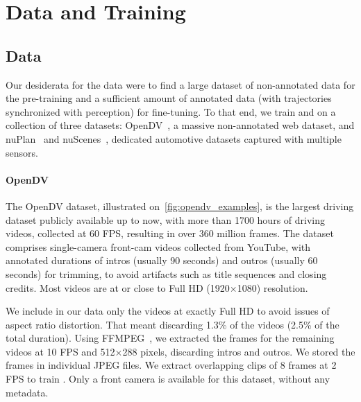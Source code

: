 \section{Data and Training}

\subsection{Data}
\label{sec:data}

Our desiderata for the data were to find a large dataset of non-annotated data for the pre-training and a sufficient amount of annotated data (with trajectories synchronized with perception) for fine-tuning. To that end, we train \vm and \vam on a collection of three datasets: OpenDV~\cite{yang2024opendv}, a massive non-annotated web dataset, and nuPlan~\cite{caesar2021nuplan} and nuScenes~\cite{caesar2020nuscenes}, dedicated automotive datasets captured with multiple sensors. 



\noindent\paragraph{OpenDV~\cite{yang2024opendv}} The OpenDV dataset, illustrated on~\autoref{fig:opendv_examples}, is the largest driving dataset publicly available up to now, with more than 1700 hours of driving videos, collected at 60 FPS, resulting in over 360 million frames. The dataset comprises single-camera front-cam videos collected from YouTube, with annotated durations of intros (usually 90 seconds) and outros (usually 60 seconds) for trimming, to avoid artifacts such as title sequences and closing credits. Most videos are at or close to Full HD (1920$\times$1080) resolution.

We include in our data only the videos at exactly Full HD to avoid issues of aspect ratio distortion. That meant discarding 1.3\% of the videos (2.5\% of the total duration). Using FFMPEG~\cite{tomar2006converting}, we extracted the frames for the remaining videos at 10 FPS and 512$\times$288 pixels, discarding intros and outros. We stored the frames in individual JPEG files. 
We extract overlapping clips of 8 frames at 2 FPS to train \vm. Only a front camera is available for this dataset, without any metadata.

